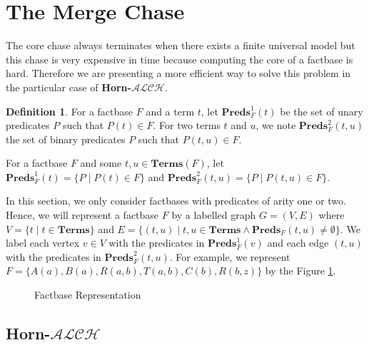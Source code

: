 \documentclass{article}
\theoremstyle{definition}
\newtheorem{definition}{Definition}[section]
\theoremstyle{remark}
\newcommand{\Terms}{\textbf{Terms}}
\newcommand{\Preds}{\textbf{Preds}}
\newcommand{\ALCH}{\textbf{Horn-$\mathcal{ALCH}$}}
\begin{document}
\section{The Merge Chase}

The core chase always terminates when there exists a finite universal model but this chase is very expensive in time because computing the core of a factbase is hard. Therefore we are presenting a more efficient way to solve this problem in the particular case of \ALCH.

\begin{definition}
For a factbase $F$ and a term $t$, let \emph{$\Preds^1_F(t)$} be the set of unary predicates $P$ such that $P(t)\in F$. For two terms $t$ and $u$, we note \emph{$\Preds^2_F(t,u)$} the set of binary predicates $P$ such that $P(t,u)\in F$. 

For a factbase $F$ and some $t, u \in \Terms(F)$, let $\Preds^1_F(t) = \{P \mid P(t) \in F\}$ and $\Preds^2_F(t, u) = \{P \mid P(t, u) \in F\}$.
\end{definition}

In this section, we only consider factbases with predicates of arity one or two. Hence, we will represent a factbase $F$ by a labelled graph $G = (V,E)$ where $V = \{t \mid t \in \Terms \}$ and $E = \{(t,u) \mid t,u \in \Terms \wedge \Preds_F(t,u) \neq \emptyset\}$. We label each vertex $v \in V$ with the predicates in $\Preds_F^1(v)$ and each edge $(t, u)$ with the predicates in $\Preds^2_F(t, u)$. For example, we represent $F = \{A(a), B(a),R(a,b),T(a,b),C(b),R(b,z)\}$ by the Figure \ref{figure:graph}.

\begin{figure}
\label{figure:graph}
\caption{Factbase Representation}
\end{figure}

\subsection{\ALCH }
\end{document}
